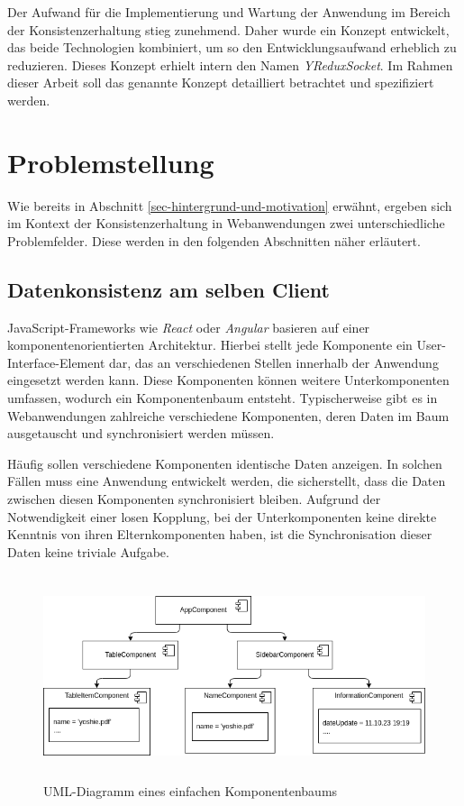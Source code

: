 \documentclass[12pt]{book}          %
\begin{document}
Der Aufwand für die Implementierung und Wartung der Anwendung im Bereich der Konsistenzerhaltung stieg zunehmend. Daher wurde ein Konzept entwickelt, das beide Technologien kombiniert, um so den Entwicklungsaufwand erheblich zu reduzieren. Dieses Konzept erhielt intern den Namen \textit{YReduxSocket}. Im Rahmen dieser Arbeit soll das genannte Konzept detailliert betrachtet und spezifiziert werden.

\section{Problemstellung}
\label{sec-problemstellung}

Wie bereits in Abschnitt \ref{sec-hintergrund-und-motivation} erwähnt, ergeben sich im Kontext der Konsistenzerhaltung in Webanwendungen zwei unterschiedliche Problemfelder. Diese werden in den folgenden Abschnitten näher erläutert.

\subsection{Datenkonsistenz am selben Client}
\label{subsec-datenkonsistenz-am-selben-client}

JavaScript-Frameworks wie \textit{React} oder \textit{Angular} basieren auf einer komponentenorientierten Architektur. Hierbei stellt jede Komponente ein User-Interface-Element dar, das an verschiedenen Stellen innerhalb der Anwendung eingesetzt werden kann. Diese Komponenten können weitere Unterkomponenten umfassen, wodurch ein Komponentenbaum entsteht. Typischerweise gibt es in Webanwendungen zahlreiche verschiedene Komponenten,
deren Daten im Baum ausgetauscht und synchronisiert werden müssen.

Häufig sollen verschiedene Komponenten identische Daten anzeigen. In solchen Fällen muss eine Anwendung entwickelt werden, die sicherstellt, dass die Daten zwischen diesen Komponenten synchronisiert bleiben. Aufgrund der Notwendigkeit einer losen Kopplung, bei der Unterkomponenten keine direkte Kenntnis von ihren Elternkomponenten haben, ist die Synchronisation dieser Daten keine triviale Aufgabe.

\begin{figure}[htbp]
\centering
\includegraphics[height=6cm]{abbildungen/components-sync-1.png}
\caption{UML-Diagramm eines einfachen Komponentenbaums}
\label{simple-component-tree-uml}
\end{figure}
\end{document}
